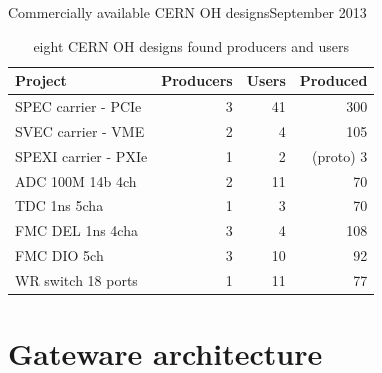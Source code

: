 \documentclass[compress,red]{beamer}
\begin{document}
\begin{frame}{Commercially available CERN OH designs}{September 2013}

  \begin{table}
    \centering
    \begin{tabular}{|l||r|r|r|}
      \hline
      Project & Producers & Users & Produced\\
      \hline\hline
      SPEC carrier - PCIe & 3 & 41 & 300 \\
      \hline
      SVEC carrier - VME & 2 & 4 & 105 \\
      \hline
      SPEXI carrier - PXIe & 1 & 2 & (proto) 3 \\
      \hline
      \hline
      ADC 100M 14b 4ch & 2 & 11 & 70 \\
      \hline
      TDC 1ns 5cha & 1 & 3 & 70 \\
      \hline
      FMC DEL 1ns 4cha & 3 & 4 & 108 \\
      \hline
      FMC DIO 5ch & 3 & 10 & 92 \\
      \hline
      \hline
      WR switch 18 ports & 1 & 11 & 77\\
      \hline
    \end{tabular}
    \caption{eight CERN OH designs found producers and users}
  \end{table}

  \note[item]{}

\end{frame}


\section{Gateware architecture}

\subsection*{} %
\end{document}
